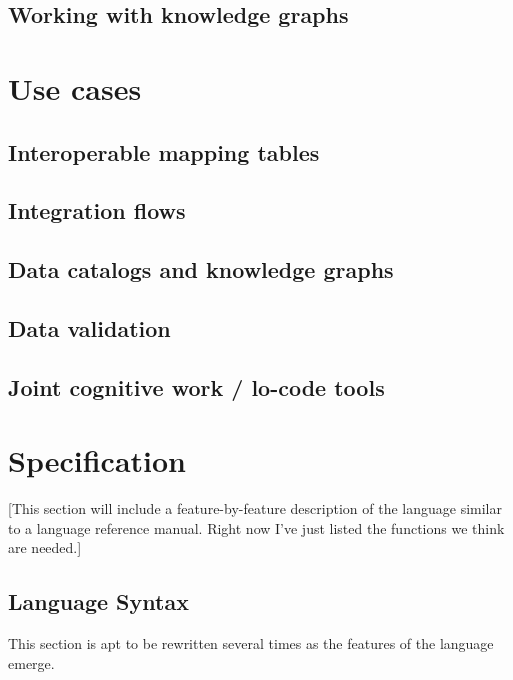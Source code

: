 \documentclass[9pt,letterpaper]{article}
\begin{document}
\subsection{Working with knowledge graphs}



\section{Use cases}

\subsection{Interoperable mapping tables}

\subsection{Integration flows}

\subsection{Data catalogs and knowledge graphs}

\subsection{Data validation}

\subsection{Joint cognitive work / lo-code tools}

\section{Specification}

[This section will include a feature-by-feature description of the language similar to a language reference manual. Right now I've just listed the functions we think are needed.]

\subsection{Language Syntax}
This section is apt to be rewritten several times as the features of the language emerge.
\end{document}
